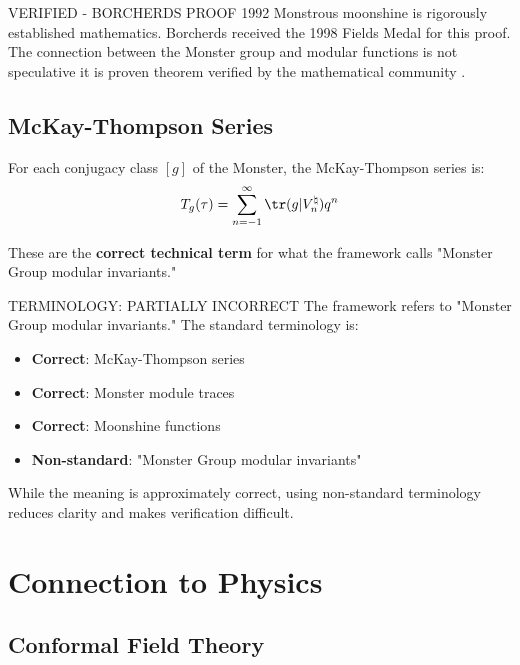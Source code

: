 \begin{factcheck}{VERIFIED - BORCHERDS PROOF 1992}
Monstrous moonshine is rigorously established mathematics. Borcherds received the 1998 Fields Medal for this proof. The connection between the Monster group and modular functions is not speculative it is proven theorem verified by the mathematical community \cite{borcherds1992monstrous}.
\end{factcheck}

\subsection{McKay-Thompson Series}

\begin{definition}
For each conjugacy class $[g]$ of the Monster, the McKay-Thompson series is:
\begin{equation}
    T_g(\tau) = \sum_{n=-1}^{\infty} \tr(g | V^{\natural}_n) q^n
\end{equation}
\end{definition}

These are the \textbf{correct technical term} for what the framework calls "Monster Group modular invariants."

\begin{factcheck}{TERMINOLOGY: PARTIALLY INCORRECT}
The framework refers to "Monster Group modular invariants." The standard terminology is:
\begin{itemize}
    \item \textbf{Correct}: McKay-Thompson series
    \item \textbf{Correct}: Monster module traces
    \item \textbf{Correct}: Moonshine functions
    \item \textbf{Non-standard}: "Monster Group modular invariants"
\end{itemize}

While the meaning is approximately correct, using non-standard terminology reduces clarity and makes verification difficult.
\end{factcheck}

\section{Connection to Physics}

\subsection{Conformal Field Theory}

